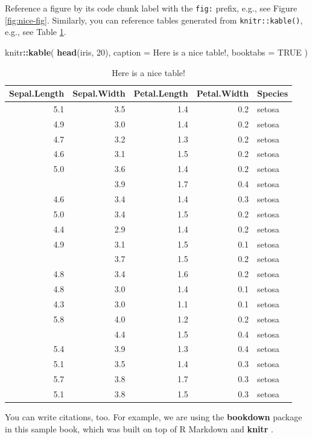 \documentclass[
]{book}
\newenvironment{Shaded}{\begin{snugshade}}{\end{snugshade}}
\newcommand{\AttributeTok}[1]{\textcolor[rgb]{0.13,0.29,0.53}{#1}}
\newcommand{\ConstantTok}[1]{\textcolor[rgb]{0.56,0.35,0.01}{#1}}
\newcommand{\DecValTok}[1]{\textcolor[rgb]{0.00,0.00,0.81}{#1}}
\newcommand{\FunctionTok}[1]{\textcolor[rgb]{0.13,0.29,0.53}{\textbf{#1}}}
\newcommand{\NormalTok}[1]{#1}
\newcommand{\SpecialCharTok}[1]{\textcolor[rgb]{0.81,0.36,0.00}{\textbf{#1}}}
\newcommand{\StringTok}[1]{\textcolor[rgb]{0.31,0.60,0.02}{#1}}
\begin{document}
Reference a figure by its code chunk label with the \texttt{fig:} prefix, e.g., see Figure \ref{fig:nice-fig}. Similarly, you can reference tables generated from \texttt{knitr::kable()}, e.g., see Table \ref{tab:nice-tab}.

\begin{Shaded}
\begin{Highlighting}[]
\NormalTok{knitr}\SpecialCharTok{::}\FunctionTok{kable}\NormalTok{(}
  \FunctionTok{head}\NormalTok{(iris, }\DecValTok{20}\NormalTok{), }\AttributeTok{caption =} \StringTok{\textquotesingle{}Here is a nice table!\textquotesingle{}}\NormalTok{,}
  \AttributeTok{booktabs =} \ConstantTok{TRUE}
\NormalTok{)}
\end{Highlighting}
\end{Shaded}

\begin{table}

\caption{\label{tab:nice-tab}Here is a nice table!}
\centering
\begin{tabular}[t]{rrrrl}
\toprule
Sepal.Length & Sepal.Width & Petal.Length & Petal.Width & Species\\
\midrule
5.1 & 3.5 & 1.4 & 0.2 & setosa\\
4.9 & 3.0 & 1.4 & 0.2 & setosa\\
4.7 & 3.2 & 1.3 & 0.2 & setosa\\
4.6 & 3.1 & 1.5 & 0.2 & setosa\\
5.0 & 3.6 & 1.4 & 0.2 & setosa\\
\addlinespace
5.4 & 3.9 & 1.7 & 0.4 & setosa\\
4.6 & 3.4 & 1.4 & 0.3 & setosa\\
5.0 & 3.4 & 1.5 & 0.2 & setosa\\
4.4 & 2.9 & 1.4 & 0.2 & setosa\\
4.9 & 3.1 & 1.5 & 0.1 & setosa\\
\addlinespace
5.4 & 3.7 & 1.5 & 0.2 & setosa\\
4.8 & 3.4 & 1.6 & 0.2 & setosa\\
4.8 & 3.0 & 1.4 & 0.1 & setosa\\
4.3 & 3.0 & 1.1 & 0.1 & setosa\\
5.8 & 4.0 & 1.2 & 0.2 & setosa\\
\addlinespace
5.7 & 4.4 & 1.5 & 0.4 & setosa\\
5.4 & 3.9 & 1.3 & 0.4 & setosa\\
5.1 & 3.5 & 1.4 & 0.3 & setosa\\
5.7 & 3.8 & 1.7 & 0.3 & setosa\\
5.1 & 3.8 & 1.5 & 0.3 & setosa\\
\bottomrule
\end{tabular}
\end{table}

You can write citations, too. For example, we are using the \textbf{bookdown} package \citep{R-bookdown} in this sample book, which was built on top of R Markdown and \textbf{knitr} \citep{xie2015}.

  
\end{document}
